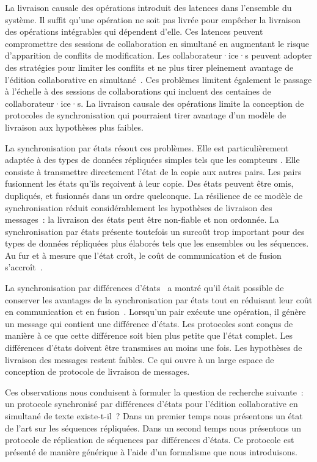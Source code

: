 La livraison causale des opérations introduit des latences dans l'ensemble du système.
Il suffit qu'une opération ne soit pas livrée pour empêcher la livraison des opérations intégrables qui dépendent d'elle.
Ces latences peuvent compromettre des sessions de collaboration en simultané en augmentant le risque d'apparition de conflits de modification.
Les collaborateur·ice·s peuvent adopter des stratégies pour limiter les conflits et ne plus tirer pleinement avantage de l'édition collaborative en simultané~\autocite{ignat2014_delayeffect}.
Ces problèmes limitent également le passage à l'échelle à des sessions de collaborations qui incluent des centaines de collaborateur·ice·s.
La livraison causale des opérations limite la conception de protocoles de synchronisation qui pourraient tirer avantage d'un modèle de livraison aux hypothèses plus faibles.

La synchronisation par états résout ces problèmes.
Elle est particulièrement adaptée à des types de données répliquées simples tels que les compteurs \autocite{almeida_2018_delta-crdt-revisited}.
Elle consiste à transmettre directement l'état de la copie aux autres pairs.
Les pairs fusionnent les états qu'ils reçoivent à leur copie.
Des états peuvent être omis, dupliqués, et fusionnés dans un ordre quelconque.
La résilience de ce modèle de synchronisation réduit considérablement les hypothèses de livraison des messages~: la livraison des états peut être non-fiable et non ordonnée.
La synchronisation par états présente toutefois un surcoût trop important pour des types de données répliquées plus élaborés tels que les ensembles ou les séquences.
Au fur et à mesure que l'état croît, le coût de communication et de fusion s'accroît~\autocite{enes_2018_efficient-sync-state-based-crdt}.

La synchronisation par différences d'états~\autocite{almeida_2018_delta-crdt-revisited} a montré qu'il était possible de conserver les avantages de la synchronisation par états tout en réduisant leur coût en communication et en fusion~\autocite{enes_2018_efficient-sync-state-based-crdt}.
Lorsqu'un pair exécute une opération, il génère un message qui contient une différence d'états.
Les protocoles sont conçus de manière à ce que cette différence soit bien plus petite que l'état complet.
Les différences d'états doivent être transmises au moins une fois.
Les hypothèses de livraison des messages restent faibles.
Ce qui ouvre à un large espace de conception de protocole de livraison de messages.

Ces observations nous conduisent à formuler la question de recherche suivante~: un protocole synchronisé par différences d'états pour l'édition collaborative en simultané de texte existe-t-il~?
Dans un premier temps nous présentons un état de l'art sur les séquences répliquées.
Dans un second temps nous présentons un protocole de réplication de séquences par différences d'états.
Ce protocole est présenté de manière générique à l'aide d'un formalisme que nous introduisons.


